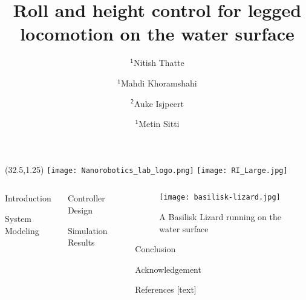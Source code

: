 \documentclass[final]{beamer}
\title{Roll and height control for legged locomotion on the water surface}
\author{$\mathsf{^1}$Nitish Thatte \and $\mathsf{^1}$Mahdi Khoramshahi \and $\mathsf{^2}$Auke Isjpeert \and  $\mathsf{^1}$Metin Sitti}
\institute{$\mathsf{^1}$Carnegie Mellon University \hspace{1EM} $\mathsf{^2}$\'{E}cole Polytechnique F\'{e}d\'{e}rale de Lausanne
}
\begin{document}
\begin{textblock}{12}(32.5,1.25)
    \texttt{[image: Nanorobotics\_lab\_logo.png]} 
    \texttt{[image: RI\_Large.jpg]}
\end{textblock}

\begin{frame}{} 
    \begin{columns}[t]
        \begin{column}{.3\linewidth}
            \begin{block}{Introduction}
                
            \end{block}
            
            \vspace{1in}
            \begin{block}{System Modeling}
                
            \end{block}
        \end{column}
        \begin{column}{.3\linewidth}
            \begin{block}{Controller Design}
                
            \end{block}
            \begin{block}{Simulation Results}
                
            \end{block}
        \end{column}
        \begin{column}{.3\linewidth}
            \begin{figure}[h]
                \centering
                \texttt{[image: basilisk-lizard.jpg]}
                \caption{A Basilisk Lizard running on the water surface}
            \end{figure}

            \begin{block}{Conclusion}
                
            \end{block}
            \vspace{0.5in}

            \begin{block}{Acknowledgement}
                \small
                
            \end{block}

            \vspace{0.5in}
            \begin{block}{References}
                \small
                [text] 
                
                
            \end{block}
        \end{column}
    \end{columns}
\end{frame}
\end{document}

